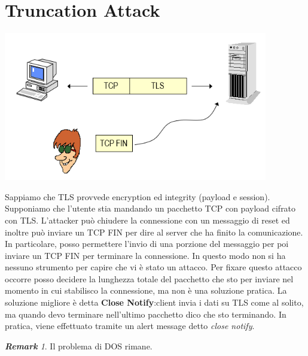 \documentclass{book}
\theoremstyle{remark}
\newtheorem*{remark}{\textbf{Remark}}
\begin{document}
\section{Truncation Attack}
\begin{center}
	\includegraphics[scale=0.6]{2021-12-09-18-01-49.png}
\end{center}
Sappiamo che TLS provvede encryption ed integrity (payload e session)\@. Supponiamo che l'utente stia mandando un pacchetto TCP con payload cifrato con TLS\@. L'attacker può chiudere la connessione con un messaggio di reset ed inoltre può inviare un TCP FIN per dire al server che ha finito la comunicazione\@. In particolare, posso permettere l'invio di una porzione del messaggio per poi inviare un TCP FIN per terminare la connessione\@. In questo modo non si ha nessuno strumento per capire che vi è stato un attacco\@. Per fixare questo attacco occorre posso decidere la lunghezza totale del pacchetto che sto per inviare nel momento in cui stabilisco la connessione, ma non è una soluzione pratica\@.\newline
La soluzione migliore è detta \textbf{Close Notify}:\@il client invia i dati su TLS come al solito, ma quando devo terminare nell'ultimo pacchetto dico che sto terminando\@. In pratica, viene effettuato tramite un alert message detto \emph{close notify}\@.
\begin{remark}
	Il problema di DOS rimane\@.
\end{remark}
\end{document}
